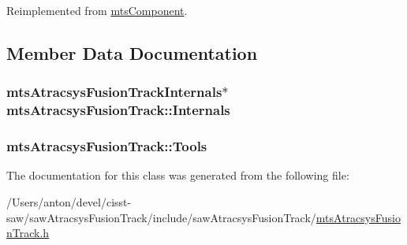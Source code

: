 Reimplemented from \hyperlink{classmts_component_aaf28f0262b44eb6866e10089a02fa6e4}{mts\+Component}.



\subsection{Member Data Documentation}
\hypertarget{classmts_atracsys_fusion_track_a2bdd364a64be4962039fad4b810e7997}{}
\subsubsection[{Internals}]{\setlength{\rightskip}{0pt plus 5cm}mts\+Atracsys\+Fusion\+Track\+Internals$\ast$ mts\+Atracsys\+Fusion\+Track\+::\+Internals\hspace{0.3cm}{\ttfamily [protected]}}\label{classmts_atracsys_fusion_track_a2bdd364a64be4962039fad4b810e7997}
\hypertarget{classmts_atracsys_fusion_track_a1d04ed198c5523f65f43758ff7fb7813}{}
\subsubsection[{Tools}]{ mts\+Atracsys\+Fusion\+Track\+::\+Tools\hspace{0.3cm}{\ttfamily [protected]}}\label{classmts_atracsys_fusion_track_a1d04ed198c5523f65f43758ff7fb7813}


The documentation for this class was generated from the following file\+:\begin{DoxyCompactItemize}
\item 
/\+Users/anton/devel/cisst-\/saw/saw\+Atracsys\+Fusion\+Track/include/saw\+Atracsys\+Fusion\+Track/\hyperlink{mts_atracsys_fusion_track_8h}{mts\+Atracsys\+Fusion\+Track.\+h}\end{DoxyCompactItemize}
